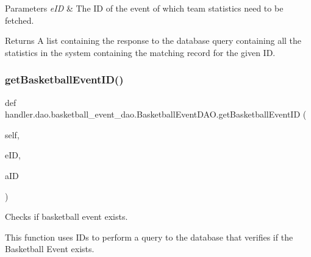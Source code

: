\begin{DoxyParams}{Parameters}
{\em e\+ID} & The ID of the event of which team statistics need to be fetched.\\
\hline
\end{DoxyParams}
\begin{DoxyReturn}{Returns}
A list containing the response to the database query containing all the statistics in the system containing the matching record for the given ID. 
\end{DoxyReturn}
\mbox{\label{classhandler_1_1dao_1_1basketball__event__dao_1_1_basketball_event_d_a_o_a755fa580876dc7ba2ee3621153a36da3}} 
\subsubsection{\texorpdfstring{get\+Basketball\+Event\+I\+D()}{getBasketballEventID()}}
{\footnotesize\ttfamily def handler.\+dao.\+basketball\+\_\+event\+\_\+dao.\+Basketball\+Event\+D\+A\+O.\+get\+Basketball\+Event\+ID (\begin{DoxyParamCaption}\item[{}]{self,  }\item[{}]{e\+ID,  }\item[{}]{a\+ID }\end{DoxyParamCaption})}



Checks if basketball event exists. 

This function uses I\+Ds to perform a query to the database that verifies if the Basketball Event exists.


